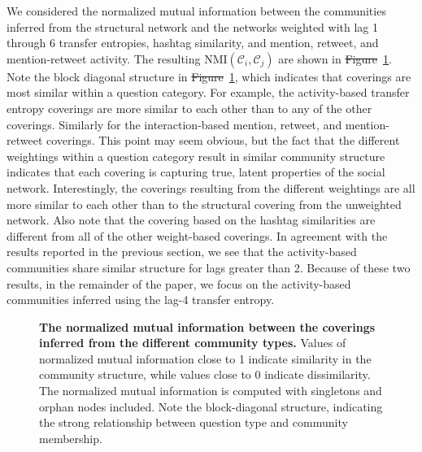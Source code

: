 \documentclass[10pt,letterpaper]{article}
\providecommand{\DIFadd}[1]{{\protect\color{blue}\uwave{#1}}} %
\providecommand{\DIFdel}[1]{{\protect\color{red}\sout{#1}}}                      %
\providecommand{\DIFaddbegin}{} %
\providecommand{\DIFaddend}{} %
\providecommand{\DIFdelbegin}{} %
\providecommand{\DIFdelend}{} %
\begin{document}
We considered the normalized mutual information between the communities inferred from the structural network and the networks weighted with lag 1 through 6 transfer entropies, hashtag similarity, and mention, retweet, and mention-retweet activity. The resulting $\text{NMI}(\mathcal{C}_{i}, \mathcal{C}_{j})$ are shown in \DIFdelbegin \DIFdel{Figure}\DIFdelend \DIFaddbegin \DIFadd{Fig.}\DIFaddend ~\ref{Fig-compare_coverings}. Note the block diagonal structure in \DIFdelbegin \DIFdel{Figure}\DIFdelend \DIFaddbegin \DIFadd{Fig.}\DIFaddend ~\ref{Fig-compare_coverings}, which indicates that coverings are most similar within a question category. For example, the activity-based transfer entropy coverings are more similar to each other than to any of the other coverings. Similarly for the interaction-based mention, retweet, and mention-retweet coverings. This point may seem obvious, but the fact that the different weightings within a question category result in similar community structure indicates that each covering is capturing true, latent properties of the social network. Interestingly, the coverings resulting from the different weightings are all more similar to each other than to the structural covering from the unweighted network. Also note that the covering based on the hashtag similarities are different from all of the other weight-based coverings. In agreement with the results reported in the previous section, we see that the activity-based communities share similar structure for lags greater than 2. Because of these two results, in the remainder of the paper, we focus on the activity-based communities inferred using the lag-4 transfer entropy.

\begin{figure}[ht!]
  \centering
  \caption{\textbf{The normalized mutual information between the coverings inferred from the different community types.}
Values of normalized mutual information close to 1 indicate similarity in the community structure, while values close to 0 indicate dissimilarity. The normalized mutual information is computed with singletons and orphan nodes included. Note the block-diagonal structure, indicating the strong relationship between question type and community membership.}
\label{Fig-compare_coverings}
\end{figure}
\end{document}
